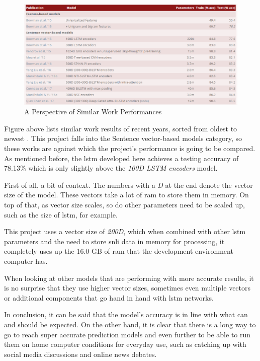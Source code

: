                 \begin{figure}[!htbp]
                    \centering
                    \includegraphics[scale=0.6]{img/snli.png}
                    \caption{A Perspective of Similar Work Performances}
                    \label{fig:snli}
                \end{figure}
                \FloatBarrier
                
                Figure above lists similar work results of recent years, sorted from oldest to newest \autocite{table:snli}. This project falls into the Sentence vector-based models category, so these works are against which the project's performance is going to be compared. As mentioned before, the \gls{lstm} developed here achieves a testing accuracy of 78.13\% which is only slightly above the \textit{100D LSTM encoders} model.
                
                First of all, a bit of context. The numbers with a \textit{D} at the end denote the vector size of the model. These vectors take a lot of \gls{ram} to store them in memory. On top of that, as vector size scales, so do other parameters need to be scaled up, such as the size of \gls{lstm}, for example.
                
                This project uses a vector size of \textit{200D}, which when combined with other \gls{lstm} parameters and the need to store \gls{snli} data in memory for processing, it completely uses up the 16.0 GB of \gls{ram} that the development environment computer has.
                
                When looking at other models that are performing with more accurate results, it is no surprise that they use higher vector sizes, sometimes even multiple vectors or additional components that go hand in hand with \gls{lstm} networks.
                
                In conclusion, it can be said that the model's accuracy is in line with what can and should be expected. On the other hand, it is clear that there is a long way to go to reach super accurate prediction models and even further to be able to run them on home computer conditions for everyday use, such as catching up with social media discussions and online news debates.
            
